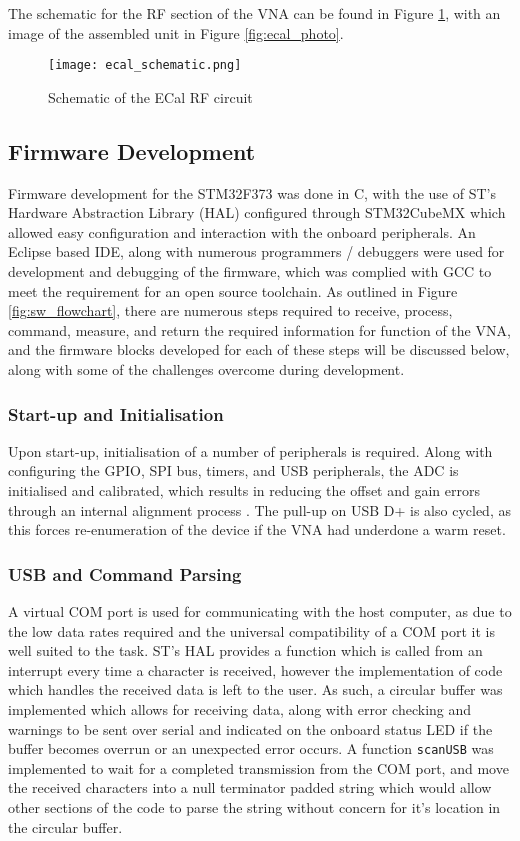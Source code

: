 The schematic for the RF section of the VNA can be found in Figure \ref{fig:ecal_schematic}, with an image of the assembled unit in Figure \ref{fig:ecal_photo}.

\begin{figure}[H]
	\centering
	\texttt{[image: ecal\_schematic.png]}
	\caption{Schematic of the ECal RF circuit}
	\label{fig:ecal_schematic}
\end{figure}

\newpage
\subsection{Firmware Development}
Firmware development for the STM32F373 was done in C, with the use of ST's Hardware Abstraction Library (HAL) configured through STM32CubeMX which allowed easy configuration and interaction with the onboard peripherals. An Eclipse based IDE, along with numerous programmers / debuggers were used for development and debugging of the firmware, which was complied with GCC to meet the requirement for an open source toolchain. As outlined in Figure \ref{fig:sw_flowchart}, there are numerous steps required to receive, process, command, measure, and return the required information for function of the VNA, and the firmware blocks developed for each of these steps will be discussed below, along with some of the challenges overcome during development. 

\subsubsection{Start-up and Initialisation}
Upon start-up, initialisation of a number of peripherals is required. Along with configuring the GPIO, SPI bus, timers, and USB peripherals, the ADC is initialised and calibrated, which results in reducing the offset and gain errors through an internal alignment process \cite{st_sdadc}. The pull-up on USB D+ is also cycled, as this forces re-enumeration of the device if the VNA had underdone a warm reset. 

\subsubsection{USB and Command Parsing}
A virtual COM port is used for communicating with the host computer, as due to the low data rates required and the universal compatibility of a COM port it is well suited to the task. ST's HAL provides a function which is called from an interrupt every time a character is received, however the implementation of code which handles the received data is left to the user. As such, a circular buffer was implemented which allows for receiving data, along with error checking and warnings to be sent over serial and indicated on the onboard status LED if the buffer becomes overrun or an unexpected error occurs. A function \texttt{scanUSB} was implemented to wait for a completed transmission from the COM port, and move the received characters into a null terminator padded string which would allow other sections of the code to parse the string without concern for it's location in the circular buffer. 

